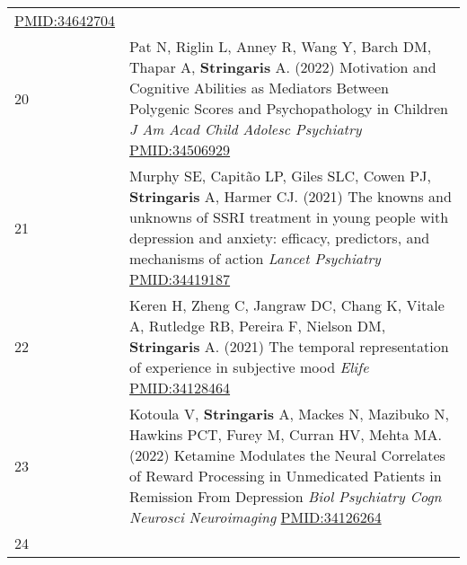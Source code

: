 \documentclass[
]{article}
\begin{document}
\begin{longtable}[]{@{}ll@{}}
\begin{minipage}[t]{0.94\columnwidth}
\url{PMID:34642704}\strut
\end{minipage}\tabularnewline
\begin{minipage}[t]{0.01\columnwidth}\raggedright
20\strut
\end{minipage} & \begin{minipage}[t]{0.94\columnwidth}\raggedright
Pat N, Riglin L, Anney R, Wang Y, Barch DM, Thapar A,
\textbf{Stringaris} A. (2022) Motivation and Cognitive Abilities as
Mediators Between Polygenic Scores and Psychopathology in Children
\emph{J Am Acad Child Adolesc Psychiatry} \url{PMID:34506929}\strut
\end{minipage}\tabularnewline
\begin{minipage}[t]{0.01\columnwidth}\raggedright
21\strut
\end{minipage} & \begin{minipage}[t]{0.94\columnwidth}\raggedright
Murphy SE, Capitão LP, Giles SLC, Cowen PJ, \textbf{Stringaris} A,
Harmer CJ. (2021) The knowns and unknowns of SSRI treatment in young
people with depression and anxiety: efficacy, predictors, and mechanisms
of action \emph{Lancet Psychiatry} \url{PMID:34419187}\strut
\end{minipage}\tabularnewline
\begin{minipage}[t]{0.01\columnwidth}\raggedright
22\strut
\end{minipage} & \begin{minipage}[t]{0.94\columnwidth}\raggedright
Keren H, Zheng C, Jangraw DC, Chang K, Vitale A, Rutledge RB, Pereira F,
Nielson DM, \textbf{Stringaris} A. (2021) The temporal representation of
experience in subjective mood \emph{Elife} \url{PMID:34128464}\strut
\end{minipage}\tabularnewline
\begin{minipage}[t]{0.01\columnwidth}\raggedright
23\strut
\end{minipage} & \begin{minipage}[t]{0.94\columnwidth}\raggedright
Kotoula V, \textbf{Stringaris} A, Mackes N, Mazibuko N, Hawkins PCT,
Furey M, Curran HV, Mehta MA. (2022) Ketamine Modulates the Neural
Correlates of Reward Processing in Unmedicated Patients in Remission
From Depression \emph{Biol Psychiatry Cogn Neurosci Neuroimaging}
\url{PMID:34126264}\strut
\end{minipage}\tabularnewline
\begin{minipage}[t]{0.01\columnwidth}\raggedright
24\strut
\end{minipage} & \begin{minipage}[t]{0.94\columnwidth}\raggedright

\end{minipage}
\end{longtable}
\end{document}
